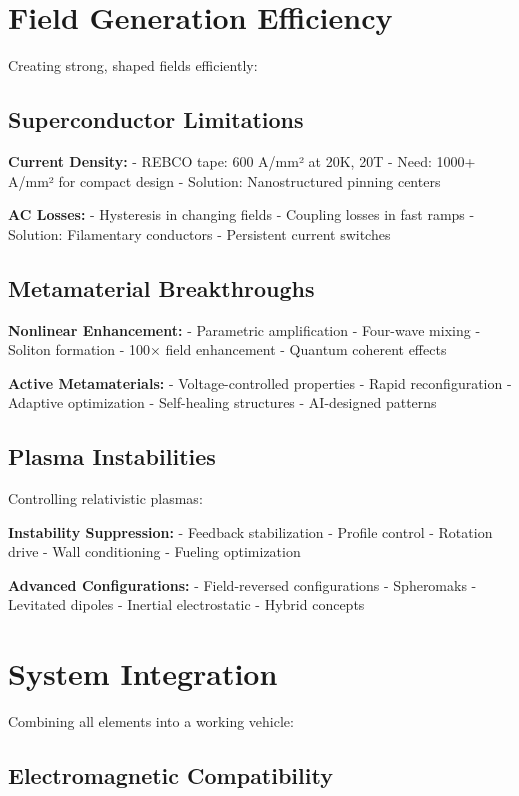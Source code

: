 \documentclass[12pt,letterpaper]{book}
\theoremstyle{definition}
\theoremstyle{plain}
\theoremstyle{remark}
\begin{document}
{{{{{\section{Field Generation Efficiency}

Creating strong, shaped fields efficiently:

\subsection{Superconductor Limitations}

\textbf{Current Density:}
- REBCO tape: 600 A/mm² at 20K, 20T
- Need: 1000+ A/mm² for compact design
- Solution: Nanostructured pinning centers

\textbf{AC Losses:}
- Hysteresis in changing fields
- Coupling losses in fast ramps
- Solution: Filamentary conductors
- Persistent current switches

\subsection{Metamaterial Breakthroughs}

\textbf{Nonlinear Enhancement:}
- Parametric amplification
- Four-wave mixing
- Soliton formation
- 100× field enhancement
- Quantum coherent effects

\textbf{Active Metamaterials:}
- Voltage-controlled properties
- Rapid reconfiguration
- Adaptive optimization
- Self-healing structures
- AI-designed patterns

\subsection{Plasma Instabilities}

Controlling relativistic plasmas:

\textbf{Instability Suppression:}
- Feedback stabilization
- Profile control
- Rotation drive
- Wall conditioning
- Fueling optimization

\textbf{Advanced Configurations:}
- Field-reversed configurations
- Spheromaks
- Levitated dipoles
- Inertial electrostatic
- Hybrid concepts

\section{System Integration}

Combining all elements into a working vehicle:

\subsection{Electromagnetic Compatibility}

}}}}}
\end{document}
